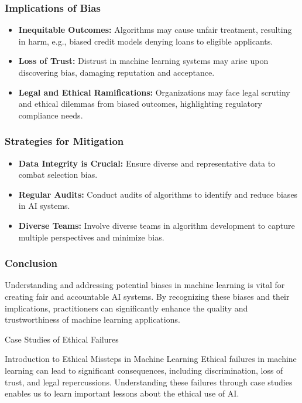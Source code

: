 \documentclass[aspectratio=169]{beamer}
\begin{document}
\begin{frame}[fragile]
    \frametitle{Implications of Bias}
    \begin{itemize}
        \item \textbf{Inequitable Outcomes:}
        Algorithms may cause unfair treatment, resulting in harm, e.g., biased credit models denying loans to eligible applicants.
        
        \item \textbf{Loss of Trust:}
        Distrust in machine learning systems may arise upon discovering bias, damaging reputation and acceptance.
        
        \item \textbf{Legal and Ethical Ramifications:}
        Organizations may face legal scrutiny and ethical dilemmas from biased outcomes, highlighting regulatory compliance needs.
    \end{itemize}
\end{frame}

\begin{frame}[fragile]
    \frametitle{Strategies for Mitigation}
    \begin{itemize}
        \item \textbf{Data Integrity is Crucial:} 
        Ensure diverse and representative data to combat selection bias.
        
        \item \textbf{Regular Audits:} 
        Conduct audits of algorithms to identify and reduce biases in AI systems.
        
        \item \textbf{Diverse Teams:} 
        Involve diverse teams in algorithm development to capture multiple perspectives and minimize bias.
    \end{itemize}
\end{frame}

\begin{frame}[fragile]
    \frametitle{Conclusion}
    Understanding and addressing potential biases in machine learning is vital for creating fair and accountable AI systems. By recognizing these biases and their implications, practitioners can significantly enhance the quality and trustworthiness of machine learning applications.
\end{frame}

\begin{frame}[fragile]{Case Studies of Ethical Failures}
    \begin{block}{Introduction to Ethical Missteps in Machine Learning}
        Ethical failures in machine learning can lead to significant consequences, including discrimination, loss of trust, and legal repercussions. 
        Understanding these failures through case studies enables us to learn important lessons about the ethical use of AI.
    \end{block}
\end{frame}
\end{document}
